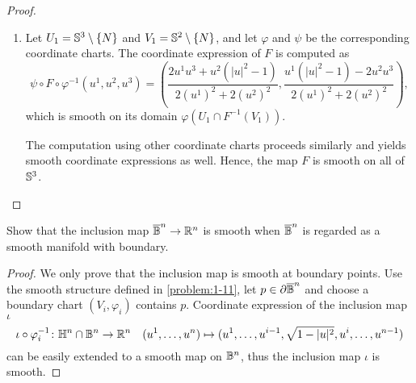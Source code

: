 \begin{problem}
\begin{proof}
\begin{enumerate}
            \item Let $U_1 = \mathbb{S}^3 \setminus \{N\}$ and $V_1 = \mathbb{S}^2 \setminus \{N\}$, and let $\varphi$ and $\psi$ be the corresponding coordinate charts. The coordinate expression of $F$ is computed as
            \[
            \psi \circ F \circ \varphi^{-1}(u^1, u^2, u^3) =
            \left(
            \frac{2u^1u^3 + u^2(|u|^2 - 1)}{2(u^1)^2 + 2(u^2)^2},
            \frac{u^1(|u|^2 - 1) - 2u^2u^3}{2(u^1)^2 + 2(u^2)^2}
            \right),
            \]
            which is smooth on its domain $\varphi(U_1 \cap F^{-1}(V_1))$.

            The computation using other coordinate charts proceeds similarly and yields smooth coordinate expressions as well. Hence, the map $F$ is smooth on all of $\mathbb{S}^3$.
        \end{enumerate}
    \end{proof}
\end{problem}

\begin{problem}
    Show that the inclusion map $\overline{\mathbb{B}}^n \to \mathbb{R}^n$ is smooth when $\overline{\mathbb{B}}^n$ is regarded as a smooth manifold with boundary.

    \begin{proof}
        We only prove that the inclusion map is smooth at boundary points. Use the smooth structure defined in \cref{problem:1-11}, let $p \in \partial \overline{\mathbb{B}}^n$ and choose a boundary chart $(V_i, \varphi_i)$ contains $p$. Coordinate expression of the inclusion map $\iota$ 
        $$ \iota \circ \varphi_i^{-1} \colon \mathbb{H}^n \cap \mathbb{B}^n \to \mathbb{R}^n \quad (u^1, \dots, u^n) \mapsto (u^1, \dots, u^{i-1}, \sqrt{1-|u|^2}, u^i, \dots, u^{n-1})$$
        can be easily extended to a smooth map on $\mathbb{B}^n$, thus the inclusion map $\iota$ is smooth.
    \end{proof}
\end{problem}

